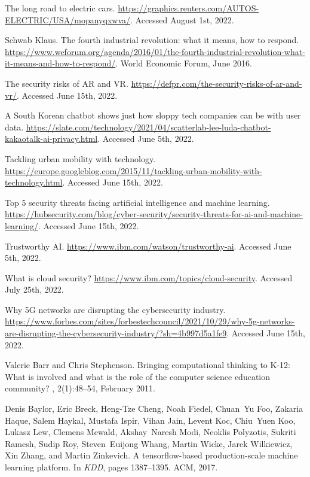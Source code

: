 \documentclass[11pt]{article}
\begin{document}
\begin{thebibliography}{10}
The long road to electric cars.
\newblock \url{https://graphics.reuters.com/AUTOS-ELECTRIC/USA/mopanyqxwva/}.
\newblock Accessed August 1st, 2022.

Schwab {K}laus. {T}he fourth industrial revolution: what it means, how to
  respond.
\newblock
  \url{https://www.weforum.org/agenda/2016/01/the-fourth-industrial-revolution-what-it-means-and-how-to-respond/}.
\newblock World Economic Forum, June 2016.

The security risks of {AR} and {VR}.
\newblock \url{ https://defpr.com/the-security-risks-of-ar-and-vr/}.
\newblock Accessed June 15th, 2022.

A {S}outh {K}orean chatbot shows just how sloppy tech companies can be with
  user data.
\newblock
  \url{https://slate.com/technology/2021/04/scatterlab-lee-luda-chatbot-kakaotalk-ai-privacy.html}.
\newblock Accessed June 5th, 2022.

Tackling urban mobility with technology.
\newblock
  \url{https://europe.googleblog.com/2015/11/tackling-urban-mobility-with-technology.html}.
\newblock Accessed June 15th, 2022.

Top 5 security threats facing artificial intelligence and machine learning.
\newblock
  \url{https://hubsecurity.com/blog/cyber-security/security-threats-for-ai-and-machine-learning/}.
\newblock Accessed June 15th, 2022.

Trustworthy {AI}.
\newblock \url{https://www.ibm.com/watson/trustworthy-ai}.
\newblock Accessed June 5th, 2022.

What is cloud security?
\newblock \url{https://www.ibm.com/topics/cloud-security}.
\newblock Accessed July 25th, 2022.

Why {5G} networks are disrupting the cybersecurity industry.
\newblock
  \url{https://www.forbes.com/sites/forbestechcouncil/2021/10/29/why-5g-networks-are-disrupting-the-cybersecurity-industry/?sh=4b997d5a1fe9}.
\newblock Accessed June 15th, 2022.

Valerie Barr and Chris Stephenson.
\newblock Bringing computational thinking to {K}-12: What is involved and what
  is the role of the computer science education community?
, 2(1):48--54, February 2011.

Denis Baylor, Eric Breck, Heng{-}Tze Cheng, Noah Fiedel, Chuan~Yu Foo, Zakaria
  Haque, Salem Haykal, Mustafa Ispir, Vihan Jain, Levent Koc, Chiu~Yuen Koo,
  Lukasz Lew, Clemens Mewald, Akshay~Naresh Modi, Neoklis Polyzotis, Sukriti
  Ramesh, Sudip Roy, Steven~Euijong Whang, Martin Wicke, Jarek Wilkiewicz, Xin
  Zhang, and Martin Zinkevich.
 {A} tensorflow-based production-scale machine learning
  platform.
\newblock In {\em KDD}, pages 1387--1395. {ACM}, 2017.


\end{thebibliography}
\end{document}
